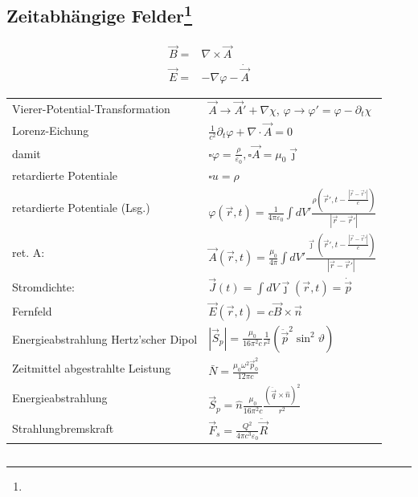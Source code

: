 \documentclass[12pt,a4paper]{article}
\newcommand{\abs}[1]{\left| #1 \right|}
\renewcommand{\=}[1]{\stackrel{#1}{=}}
\newcommand{\rd}{\abs{\vec r - \vec r'}}
\newcommand{\ort}{\vec r}
\newcommand{\js}{\vec \jmath}
\theoremstyle{definition}
\theoremstyle{remark}
\begin{document}
\begin{center}
\begin{minipage}[t]{.5\linewidth}
\end{minipage}
\end{center}

\newpage

\subsection[Zeitabhängige Felder]{Zeitabhängige Felder\let\thefootnote\relax\footnote{}}

\begin{framed}
\begin{align*}
\vec B =& \nabla \times \vec A\\
\vec E =& - \nabla \varphi - \dot{\vec{A}}
\end{align*}
\end{framed}


\begin{center}
\begin{minipage}[t]{.35\linewidth}
\vspace{0pt}
\noindent\begin{tabular}{ll}
Vierer-Potential-Transformation & $\vec A \longrightarrow \vec A' + \nabla \chi$, $\varphi \longrightarrow \varphi' = \varphi - \partial_t \chi$\\
Lorenz-Eichung & $\frac{1}{c^2} \partial_t \varphi + \nabla \cdot \vec A = 0$\\
damit & $\square \varphi = \frac{\rho}{\varepsilon_0}, \square \vec A = \mu_0 \js$\\
retardierte Potentiale & $\square u = \rho$\\
retardierte Potentiale (Lsg.) & $\varphi (\ort, t) = \frac{1}{4\pi \varepsilon_0} \int dV' \frac{\rho(\ort', t- \frac{\rd}{c})}{\rd}$\\
ret. A: & $\vec A (\ort, t) = \frac{\mu_0}{4\pi} \int dV' \frac{\js(\ort', t-\frac{\rd}{c})}{\rd}$\\
Stromdichte: & $\vec J(t) = \int dV \js (\ort, t) = \dot{\vec{p}}$\\
Fernfeld & $\vec E(\ort, t) = c \vec B \times \vec n$\\
Energieabstrahlung Hertz'scher Dipol & $\abs{\vec S_p} = \frac{\mu_0}{16\pi^2c} \frac{1}{r^2} (\ddot{\vec{p}}^2 \sin^2 \vartheta)$\\
Zeitmittel abgestrahlte Leistung & $\bar N = \frac{\mu_0 \omega^2 \vec p_0^2}{12 \pi c}$\\
Energieabstrahlung & $\vec S_p = \hat n \frac{\mu_0}{16\pi^2 c} \frac{(\ddot{\vec{q}} \times \hat n)^2}{r^2}$\\
Strahlungbremskraft & $\vec F_s = \frac{Q^2}{4\pi c^3 \varepsilon_0} \ddot{\vec{R}}$\\
\end{tabular}
\end{minipage}%
\begin{minipage}[t]{.65\linewidth}
\vspace{0pt}
\begin{tabular}{ll}

\end{tabular}
\end{minipage}
\end{center}
\end{document}
